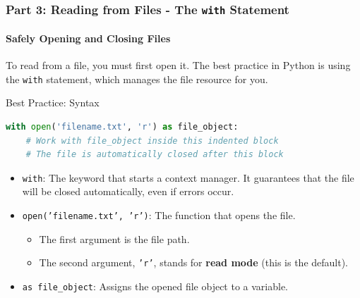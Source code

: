 \documentclass{beamer}
\begin{document}
\begin{frame}[fragile]
    \frametitle{Part 3: Reading from Files - The \texttt{with} Statement}
    \framesubtitle{Safely Opening and Closing Files}

    To read from a file, you must first open it. The best practice in Python is using the \texttt{with} statement, which manages the file resource for you.

    \begin{block}{Best Practice: Syntax}
        \begin{lstlisting}[language=Python]
with open('filename.txt', 'r') as file_object:
    # Work with file_object inside this indented block
    # The file is automatically closed after this block
        \end{lstlisting}
    \end{block}

    \begin{itemize}
        \item \texttt{with}: The keyword that starts a context manager. It guarantees that the file will be closed automatically, even if errors occur.
        \item \texttt{open('filename.txt', 'r')}: The function that opens the file.
              \begin{itemize}
                  \item The first argument is the file path.
                  \item The second argument, \texttt{'r'}, stands for \textbf{read mode} (this is the default).
              \end{itemize}
        \item \texttt{as file\_object}: Assigns the opened file object to a variable.
    \end{itemize}
\end{frame}
\end{document}
